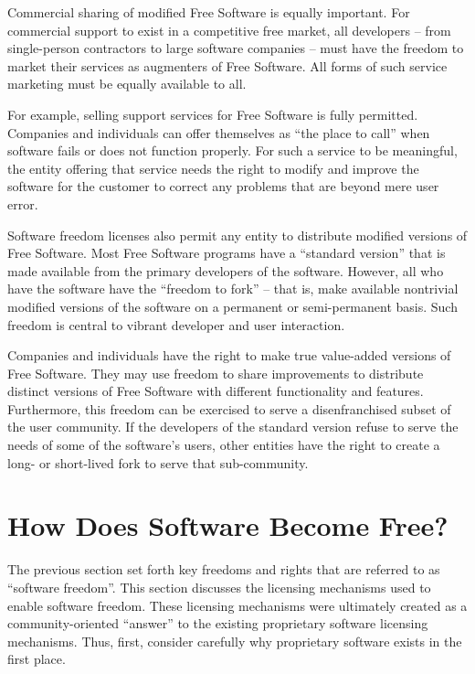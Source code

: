 Commercial sharing of modified Free Software is equally important.
For commercial support to exist in a competitive free market, all
developers -- from single-person contractors to large software
companies -- must have the freedom to market their services as
augmenters of Free Software.  All forms of such service marketing must
be equally available to all.

For example, selling support services for Free Software is fully
permitted. Companies and individuals can offer themselves as ``the place
to call'' when software fails or does not function properly.  For such a
service to be meaningful, the entity offering that service needs the
right to modify and improve the software for the customer to correct any
problems that are beyond mere user error.

Software freedom licenses also permit any entity to distribute modified
versions of Free Software.  Most Free Software programs have a ``standard
version'' that is made available from the primary developers of the software.
However, all who have the software have the ``freedom to fork'' -- that is,
make available nontrivial modified versions of the software on a permanent or
semi-permanent basis.  Such freedom is central to vibrant developer and user
interaction.

Companies and individuals have the right to make true value-added versions
of Free Software.  They may use freedom to share improvements to
distribute distinct versions of Free Software with different functionality
and features.  Furthermore, this freedom can be exercised to serve a
disenfranchised subset of the user community.  If the developers of the
standard version refuse to serve the needs of some of the software's
users, other entities have the right to create a long- or short-lived fork
to serve that sub-community.

\section{How Does Software Become Free?}

The previous section set forth key freedoms and rights that are referred to
as ``software freedom''.  This section discusses the licensing mechanisms
used to enable software freedom.  These licensing mechanisms were ultimately
created as a community-oriented ``answer'' to the existing proprietary
software licensing mechanisms.  Thus, first, consider carefully why
proprietary software exists in the first place.

